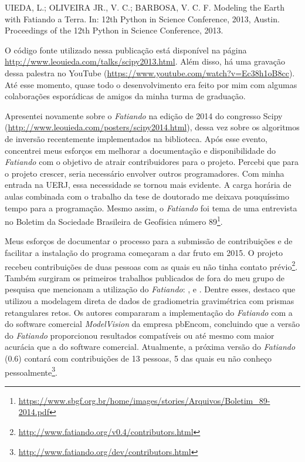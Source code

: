 \begin{displayquote}
    UIEDA, L.; OLIVEIRA JR., V. C.; BARBOSA, V. C. F.  Modeling the Earth with
    Fatiando a Terra. In: 12th Python in Science Conference, 2013, Austin.
    Proceedings of the 12th Python in Science Conference, 2013.
\end{displayquote}

O código fonte utilizado nessa publicação está disponível na página
\url{http://www.leouieda.com/talks/scipy2013.html}. Além disso, há uma gravação
dessa palestra no YouTube (\url{https://www.youtube.com/watch?v=Ec38h1oB8cc}).
Até esse momento, quase todo o desenvolvimento era feito por mim com algumas
colaborações esporádicas de amigos da minha turma de graduação.

Apresentei novamente sobre o \textit{Fatiando} na edição de 2014 do congresso
Scipy (\url{http://www.leouieda.com/posters/scipy2014.html}), dessa vez sobre
os algoritmos de inversão recentemente implementados na biblioteca.
Após esse evento, concentrei meus esforços em melhorar a documentação e
disponibilidade do \textit{Fatiando} com o objetivo de atrair
contribuidores para o projeto.
Percebi que para o projeto crescer, seria necessário envolver outros
programadores.
Com minha entrada na UERJ, essa necessidade se tornou mais evidente.
A carga horária de aulas combinada com o trabalho da tese de doutorado me
deixava pouquíssimo tempo para a programação.
Mesmo assim, o \textit{Fatiando} foi tema de uma entrevista no Boletim da
Sociedade Brasileira de Geofísica número
89\footnote{\url{https://www.sbgf.org.br/home/images/stories/Arquivos/Boletim_89-2014.pdf}}.

Meus esforços de documentar o processo para a submissão de contribuições e de
facilitar a instalação do programa começaram a dar fruto em 2015.
O projeto recebeu contribuições de duas pessoas com as quais eu não tinha
contato prévio\footnote{\url{http://www.fatiando.org/v0.4/contributors.html}}.
Também surgiram os primeiros trabalhos publicados de fora do meu grupo de
pesquisa que mencionam a utilização do \textit{Fatiando}:
\citet{niccoli2015}, \citet{matthews2016} e \citet{bassett2016}.
Dentre esses, destaco \citet{matthews2016} que utilizou a modelagem direta de
dados de gradiometria gravimétrica com prismas retangulares retos.
Os autores compararam a implementação do \textit{Fatiando} com a do software
comercial \textit{ModelVision} da empresa pbEncom, concluindo que a versão do
\textit{Fatiando} proporcionou resultados compatíveis ou até mesmo com maior
acurácia que a do software comercial.
Atualmente, a próxima versão do \textit{Fatiando} (0.6) contará com
contribuições de 13 pessoas, 5 das quais eu não conheço
pessoalmente\footnote{\url{http://www.fatiando.org/dev/contributors.html}}.

